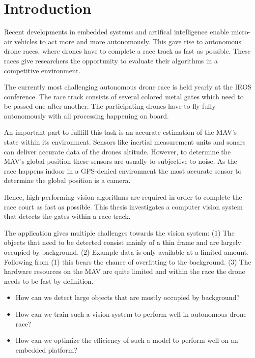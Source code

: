 \chapter{Introduction}
\label{sec:intro}

Recent developments in embedded systems and artifical intelligence enable micro-air vehicles to act more and more autonomously. This gave rise to autonomous drone races, where drones have to complete a race track as fast as possible. These races give researchers the opportunity to evaluate their algorithms in a competitive environment.

The currently most challenging autonomous drone race is held yearly at the IROS conference. The race track consists of several colored metal gates which need to be passed one after another. The participating drones have to fly fully autonomously with all processing happening on board.

An important part to fullfill this task is an accurate estimation of the MAV's state within its environment. Sensors like inertial measurement units and sonars can deliver accurate data of the drones altitude. However, to determine the MAV's global position these sensors are usually to subjective to noise. As the race happens indoor in a GPS-denied environment the most accurate sensor to determine the global position is a camera.

Hence, high-performing vision algorithms are required in order to complete the race court as fast as possible. This thesis investigates a computer vision system that detects the gates within a race track.

The application gives multiple challenges towards the vision system: (1) The objects that need to be detected consist mainly of a thin frame and are largely occupied by background. (2) Example data is only available at a limited amount. Following from (1) this bears the chance of overfitting to the background. (3) The hardware resources on the MAV are quite limited and within the race the drone needs to be fast by definition.

\begin{itemize}
	\item How can we detect large objects that are mostly occupied by background?
	\item How can we train such a vision system to perform well in autonomous drone race?
	\item How can we optimize the efficiency of such a model to perform well on an embedded platform?
\end{itemize}